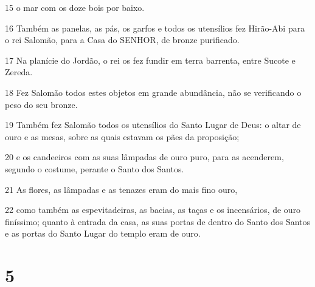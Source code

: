 \par 15 o mar com os doze bois por baixo.
\par 16 Também as panelas, as pás, os garfos e todos os utensílios fez Hirão-Abi para o rei Salomão, para a Casa do SENHOR, de bronze purificado.
\par 17 Na planície do Jordão, o rei os fez fundir em terra barrenta, entre Sucote e Zereda.
\par 18 Fez Salomão todos estes objetos em grande abundância, não se verificando o peso do seu bronze.
\par 19 Também fez Salomão todos os utensílios do Santo Lugar de Deus: o altar de ouro e as mesas, sobre as quais estavam os pães da proposição;
\par 20 e os candeeiros com as suas lâmpadas de ouro puro, para as acenderem, segundo o costume, perante o Santo dos Santos.
\par 21 As flores, as lâmpadas e as tenazes eram do mais fino ouro,
\par 22 como também as espevitadeiras, as bacias, as taças e os incensários, de ouro finíssimo; quanto à entrada da casa, as suas portas de dentro do Santo dos Santos e as portas do Santo Lugar do templo eram de ouro.

\chapter{5}

